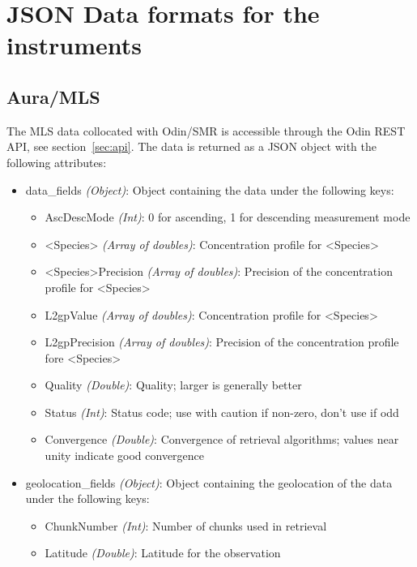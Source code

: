 \chapter{JSON Data formats for the instruments}

\label{sec:dataformats}
\section{Aura/MLS}
The MLS data collocated with Odin/SMR is accessible through the Odin REST
API, see section~\ref{sec:api}. The data is returned as a JSON object with the
following attributes:
\begin{itemize}
    \item data\_fields \emph{(Object)}: Object containing the data under the
        following keys:
        \begin{itemize}
            \item AscDescMode \emph{(Int)}: 0 for ascending, 1 for descending
                measurement mode
            \item <Species> \emph{(Array of doubles)}: Concentration profile
                for <Species>
            \item <Species>Precision \emph{(Array of doubles)}: Precision of
                the concentration profile for <Species>
            \item L2gpValue \emph{(Array of doubles)}: Concentration profile
                for <Species>
            \item L2gpPrecision \emph{(Array of doubles)}: Precision of the
                concentration profile fore <Species>
            \item Quality \emph{(Double)}: Quality; larger is generally better
            \item Status \emph{(Int)}: Status code; use with caution if
                non-zero, don't use if odd
            \item Convergence \emph{(Double)}: Convergence of retrieval
                algorithms; values near unity indicate good convergence
        \end{itemize}
    \item geolocation\_fields \emph{(Object)}: Object containing the
        geolocation of the data under the following keys:
        \begin{itemize}
            \item ChunkNumber \emph{(Int)}: Number of chunks used in retrieval
            \item Latitude \emph{(Double)}: Latitude for the observation

\end{itemize}
\end{itemize}
